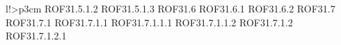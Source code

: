 \begin{tabella}{l!{\VRule}>{\centering\arraybackslash}p{3cm}}
\linebreak ROF31.5.1.2 \linebreak ROF31.5.1.3 \linebreak ROF31.6 \linebreak ROF31.6.1 \linebreak ROF31.6.2 \linebreak ROF31.7 \linebreak ROF31.7.1 \linebreak ROF31.7.1.1 \linebreak ROF31.7.1.1.1 \linebreak ROF31.7.1.1.2 \linebreak ROF31.7.1.2 \linebreak ROF31.7.1.2.1 \lineb
\end{tabella}
